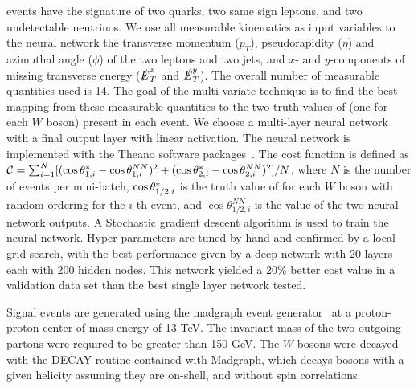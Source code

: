 \ssWW events have the signature of two quarks, two same sign leptons, and
two undetectable neutrinos.  We use all measurable kinematics as input variables
to the neural network the transverse momentum ($p_T$), pseudorapidity ($\eta$) and
azimuthal angle ($\phi$) of the two leptons and two jets, and $x$- and $y$-components 
of missing transverse energy ($\slashed{E}_T^x$ and
$\slashed{E}_T^y$).  The overall number of measurable quantities used is 14. 
The goal of the multi-variate technique is to find
the best mapping from these measurable quantities to the two truth
values of \cts (one for each $W$ boson) present in each event.  We
choose a multi-layer neural network with a final output layer with
linear activation. The neural network is implemented with the Theano
software packages~\cite{theano1,theano2}. The cost function is defined as 
${\cal{C}}= \sum_{i=1}^{N} [(\ctsnb_{1,i} -\cos \theta^{NN}_{1,i})^2+(\ctsnb_{2,i}-\cos \theta^{NN}_{2,i})^2]/N$, 
where $N$ is the number of events per mini-batch,
$ \cos  \theta^{*}  _{1/2,i}$ is the truth value of \cts for each $W$ boson with
random ordering for the $i$-th event, and $\cos \theta^{NN}_{1/2, i}$ is the value of
the two neural network outputs. A Stochastic gradient descent
algorithm is used to train the neural network. Hyper-parameters are tuned by hand and confirmed
by a local grid search, with the best performance given by a deep network with 20 layers each with 200 hidden nodes.
This network yielded a 20\% better cost value in a validation data set than the best single layer network tested.   


Signal \ssWW events are generated using the {\sc madgraph} event generator~\cite{madgraph} at a proton-proton center-of-mass energy of 13 TeV. %
 The invariant mass of the two outgoing partons were required to be greater than 150 GeV. The $W$ bosons were decayed with the DECAY routine contained with Madgraph, which decays bosons with a given helicity assuming they are on-shell, and without spin correlations.%

